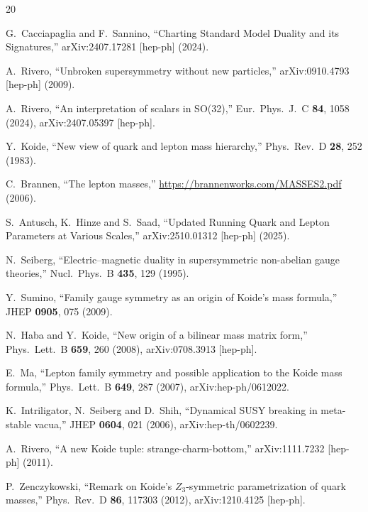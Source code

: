 \documentclass[11pt,a4paper]{article}
\theoremstyle{definition}\newtheorem{exercise}{Exercise}[section]
\begin{document}
\begin{thebibliography}{20}

G.~Cacciapaglia and F.~Sannino,
``Charting Standard Model Duality and its Signatures,''
arXiv:2407.17281 [hep-ph] (2024).

A.~Rivero,
``Unbroken supersymmetry without new particles,''
arXiv:0910.4793 [hep-ph] (2009).

A.~Rivero,
``An interpretation of scalars in SO(32),''
Eur.\ Phys.\ J.\ C \textbf{84}, 1058 (2024),
arXiv:2407.05397 [hep-ph].

Y.~Koide,
``New view of quark and lepton mass hierarchy,''
Phys.\ Rev.\ D \textbf{28}, 252 (1983).

C.~Brannen,
``The lepton masses,''
\url{https://brannenworks.com/MASSES2.pdf} (2006).

S.~Antusch, K.~Hinze and S.~Saad,
``Updated Running Quark and Lepton Parameters at Various Scales,''
arXiv:2510.01312 [hep-ph] (2025).

N.~Seiberg,
``Electric--magnetic duality in supersymmetric non-abelian gauge
theories,''
Nucl.\ Phys.\ B \textbf{435}, 129 (1995).

Y.~Sumino,
``Family gauge symmetry as an origin of Koide's mass formula,''
JHEP \textbf{0905}, 075 (2009).

N.~Haba and Y.~Koide,
``New origin of a bilinear mass matrix form,''
Phys.\ Lett.\ B \textbf{659}, 260 (2008),
arXiv:0708.3913 [hep-ph].

E.~Ma,
``Lepton family symmetry and possible application to the Koide mass formula,''
Phys.\ Lett.\ B \textbf{649}, 287 (2007),
arXiv:hep-ph/0612022.

K.~Intriligator, N.~Seiberg and D.~Shih,
``Dynamical SUSY breaking in meta-stable vacua,''
JHEP \textbf{0604}, 021 (2006),
arXiv:hep-th/0602239.

A.~Rivero,
``A new Koide tuple: strange-charm-bottom,''
arXiv:1111.7232 [hep-ph] (2011).

P.~Zenczykowski,
``Remark on Koide's $Z_3$-symmetric parametrization of
quark masses,''
Phys.\ Rev.\ D \textbf{86}, 117303 (2012),
arXiv:1210.4125 [hep-ph].

\end{thebibliography}
\end{document}
